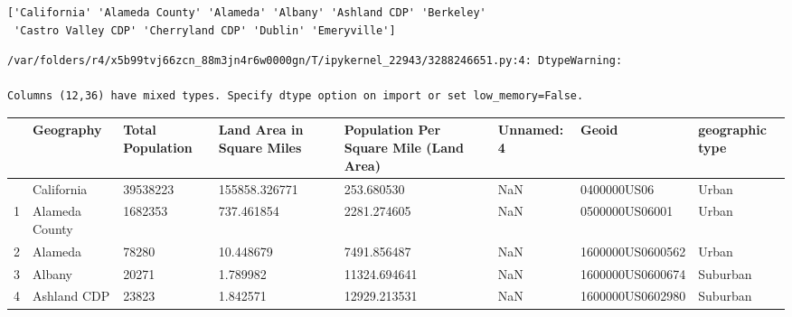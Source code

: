 \documentclass[
  letterpaper,
  DIV=11,
  numbers=noendperiod]{scrartcl}
\newenvironment{Shaded}{\begin{snugshade}}{\end{snugshade}}
\newcommand{\BuiltInTok}[1]{\textcolor[rgb]{0.00,0.23,0.31}{#1}}
\newcommand{\DecValTok}[1]{\textcolor[rgb]{0.68,0.00,0.00}{#1}}
\newcommand{\NormalTok}[1]{\textcolor[rgb]{0.00,0.23,0.31}{#1}}
\newcommand{\OperatorTok}[1]{\textcolor[rgb]{0.37,0.37,0.37}{#1}}
\newcommand{\StringTok}[1]{\textcolor[rgb]{0.13,0.47,0.30}{#1}}
\newcommand{\VariableTok}[1]{\textcolor[rgb]{0.07,0.07,0.07}{#1}}
\newcommand{\VerbatimStringTok}[1]{\textcolor[rgb]{0.13,0.47,0.30}{#1}}
\begin{document}
\begin{Shaded}
\end{Shaded}

\begin{verbatim}
['California' 'Alameda County' 'Alameda' 'Albany' 'Ashland CDP' 'Berkeley'
 'Castro Valley CDP' 'Cherryland CDP' 'Dublin' 'Emeryville']
\end{verbatim}

\begin{verbatim}
/var/folders/r4/x5b99tvj66zcn_88m3jn4r6w0000gn/T/ipykernel_22943/3288246651.py:4: DtypeWarning:

Columns (12,36) have mixed types. Specify dtype option on import or set low_memory=False.
\end{verbatim}

\begin{longtable}[]{@{}llllllll@{}}
\toprule\noalign{}
& Geography & Total Population & Land Area in Square Miles & Population
Per Square Mile (Land Area) & Unnamed: 4 & Geoid & geographic type \\
\midrule\noalign{}
\endhead
\bottomrule\noalign{}
\endlastfoot
0 & California & 39538223 & 155858.326771 & 253.680530 & NaN &
0400000US06 & Urban \\
1 & Alameda County & 1682353 & 737.461854 & 2281.274605 & NaN &
0500000US06001 & Urban \\
2 & Alameda & 78280 & 10.448679 & 7491.856487 & NaN & 1600000US0600562 &
Urban \\
3 & Albany & 20271 & 1.789982 & 11324.694641 & NaN & 1600000US0600674 &
Suburban \\
4 & Ashland CDP & 23823 & 1.842571 & 12929.213531 & NaN &
1600000US0602980 & Suburban \\
\end{longtable}
\end{document}
